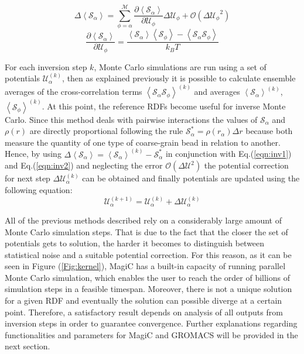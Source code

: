 \documentclass[10pt,a4paper,twoside]{article}
\begin{document}
 \begin{equation}
\Delta\left\langle\mathcal{S}_\alpha\right\rangle = \sum_{\phi=\alpha}^\mathcal{M}\dfrac{\partial\left\langle\mathcal{S}_\alpha\right\rangle}{\partial\mathcal{U}_\phi}\Delta\mathcal{U}_\phi + \mathcal{O}({\Delta\mathcal{U}_\phi}^2)
\label{eqn:inv1}
\end{equation}
 \begin{equation}
\dfrac{\partial\left\langle\mathcal{S}_\alpha\right\rangle}{\partial\mathcal{U}_\phi} = \dfrac{ \left\langle\mathcal{S}_\alpha\right\rangle\left\langle\mathcal{S}_\phi\right\rangle - \left\langle\mathcal{S}_\alpha\mathcal{S}_\phi\right\rangle}{k_B T}
\label{eqn:inv2}
\end{equation}

For each inversion step $k$, Monte Carlo simulations are run using a set of potentials $\mathcal{U}_{\alpha}^{(k)}$, then as explained previously it is possible to calculate ensemble averages of the cross-correlation terms ${\left\langle\mathcal{S}_\alpha\mathcal{S}_\phi\right\rangle}^{(k)}$ and averages $\left\langle\mathcal{S}_\alpha\right\rangle^{(k)}$, $\left\langle\mathcal{S}_\phi\right\rangle^{(k)}$. At this point, the reference RDFs become useful for inverse Monte Carlo. Since this method deals with pairwise interactions the values of $\mathcal{S}_\alpha$ and $\rho(r)$ are directly proportional following the rule $\mathcal{S}_\alpha^{*}= \rho(r_\alpha)\Delta r $ \cite{magic} because both measure the quantity of one type of coarse-grain bead in relation to another. Hence, by using $\Delta\left\langle\mathcal{S}_\alpha\right\rangle = \left\langle\mathcal{S}_\alpha\right\rangle^{(k)} - \mathcal{S}_\alpha^{*}$  in conjunction with Eq.(\ref{eqn:inv1}) and Eq.(\ref{eqn:inv2}) and neglecting the error $\mathcal{O}({\Delta\mathcal{U}}^2)$ the potential correction for next step $\Delta\mathcal{U}_\alpha^{(k)}$ can be obtained and finally potentials are updated using the following  equation:
 \begin{equation}
\mathcal{U}_\alpha^{(k+1)}= \mathcal{U}_\alpha^{(k)}+\Delta\mathcal{U}_\alpha^{(k)}
\label{eqn:potup}
\end{equation} 

All of the previous methods described rely on a considerably large amount of Monte Carlo simulation steps. That is due to the fact that the closer the set of potentials gets to solution, the harder it becomes to distinguish between statistical noise and a suitable potential correction. For this reason, as it can be seen in Figure (\ref{Fig:kernel}), MagiC has a built-in capacity of running parallel Monte Carlo simulation, which enables the user to reach the order of billions of simulation steps in a feasible timespan. Moreover, there is not a unique solution for a given RDF \cite{ibi} and eventually the solution can possible diverge at a certain point. Therefore, a satisfactory result depends on analysis of all outputs from inversion steps in order to guarantee convergence. Further explanations regarding functionalities and parameters for MagiC and GROMACS will be provided in the next section.  
\end{document}
